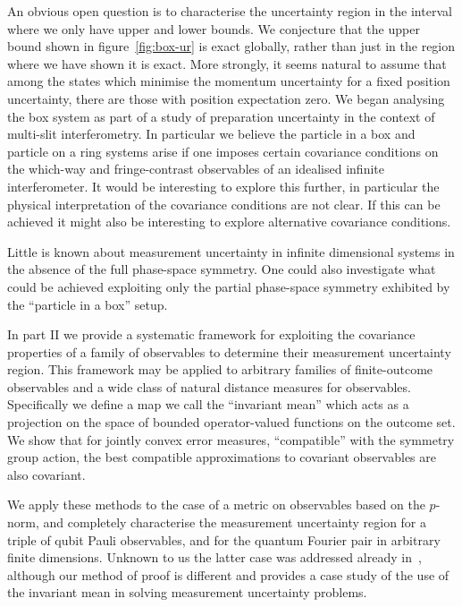 An obvious open question is to characterise the uncertainty region in the interval where we only have upper and lower bounds. We conjecture that the upper bound shown in figure~\ref{fig:box-ur} is exact globally, rather than just in the region where we have shown it is exact. More strongly, it seems natural to assume that among the states which minimise the momentum uncertainty for a fixed position uncertainty, there are those with position expectation zero. We began analysing the box system as part of a study of preparation uncertainty in the context of multi-slit interferometry. In particular we believe the particle in a box and particle on a ring systems arise if one imposes certain covariance conditions on the which-way and fringe-contrast observables of an idealised infinite interferometer. It would be interesting to explore this further, in particular the physical interpretation of the covariance conditions are not clear. If this can be achieved it might also be interesting to explore alternative covariance conditions.

Little is known about measurement uncertainty in infinite dimensional systems in the absence of the full phase-space symmetry. One could also investigate what could be achieved exploiting only the partial phase-space symmetry exhibited by the ``particle in a box'' setup.


In part II we provide a systematic framework for exploiting the covariance properties of a family of observables to determine their measurement uncertainty region. This framework may be applied to arbitrary families of finite-outcome observables and a wide class of natural distance measures for observables. Specifically we define a map we call the ``invariant mean'' which acts as a projection on the space of bounded operator-valued functions on the outcome set. We show that for jointly convex error measures, ``compatible'' with the symmetry group action, the best compatible approximations to covariant observables are also covariant.

We apply these methods to the case of a metric on observables based on the $p$-norm, and completely characterise the measurement uncertainty region for a triple of qubit Pauli observables, and for the quantum Fourier pair in arbitrary finite dimensions. Unknown to us the latter case was addressed already in~\cite{Werner2016}, although our method of proof is different and provides a case study of the use of the invariant mean in solving measurement uncertainty problems.

